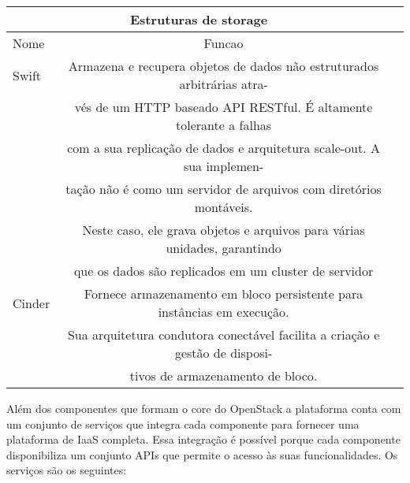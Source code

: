 \documentclass[a4paper]{book}
\begin{document}
			\begin{center}
				\begin{tabular}{|l||c|c|}
				\hline
				\multicolumn{2}{|c|}{\textbf{Estruturas de storage}}\\
				\hline
				Nome		&Funcao\\
				\hline \hline
				Swift&	
Armazena e recupera objetos de dados não estruturados arbitrárias atra-\\&vés de um HTTP baseado API RESTful. É altamente tolerante a falhas\\& com a sua replicação de dados e arquitetura scale-out. A sua implemen-\\&tação não é como um servidor de arquivos com diretórios montáveis.\\& Neste caso, ele grava objetos e arquivos para várias unidades, garantindo\\& que os dados são replicados em um cluster de servidor\\
				\hline \hline
				Cinder&	
Fornece armazenamento em bloco persistente para instâncias em execução.\\& Sua arquitetura condutora conectável facilita a criação e gestão de disposi-\\&tivos de armazenamento de bloco.\\
\hline
				\end{tabular}
			\end{center}
		
Além dos componentes que formam o core do OpenStack a plataforma conta com um conjunto de serviços que integra cada componente para fornecer uma plataforma de IaaS completa. Essa integração é possível porque cada componente disponibiliza um conjunto APIs que permite o acesso às suas funcionalidades. Os serviços são os seguintes:			
\end{document}

